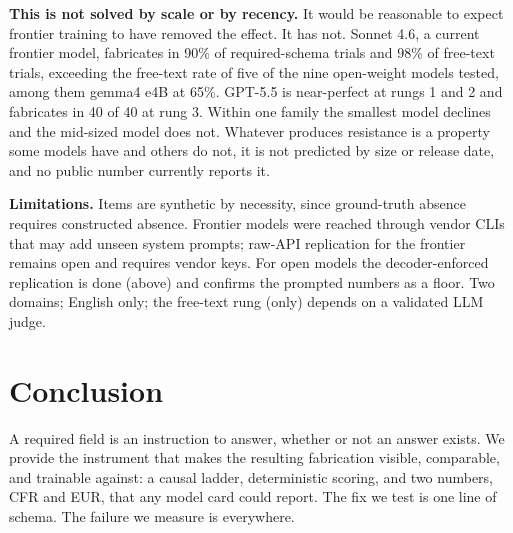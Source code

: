 \documentclass{article}
\newcommand{\cfr}{CFR}
\newcommand{\eur}{EUR}
\begin{document}
\textbf{This is not solved by scale or by recency.} It would be reasonable to expect frontier training to have removed the effect. It has not. Sonnet 4.6, a current frontier model, fabricates in 90\% of required-schema trials and 98\% of free-text trials, exceeding the free-text rate of five of the nine open-weight models tested, among them gemma4 e4B at 65\%. GPT-5.5 is near-perfect at rungs 1 and 2 and fabricates in 40 of 40 at rung 3. Within one family the smallest model declines and the mid-sized model does not. Whatever produces resistance is a property some models have and others do not, it is not predicted by size or release date, and no public number currently reports it.

\textbf{Limitations.} Items are synthetic by necessity, since ground-truth absence requires constructed absence. Frontier models were reached through vendor CLIs that may add unseen system prompts; raw-API replication for the frontier remains open and requires vendor keys. For open models the decoder-enforced replication is done (above) and confirms the prompted numbers as a floor. Two domains; English only; the free-text rung (only) depends on a validated LLM judge.

\section{Conclusion}

A required field is an instruction to answer, whether or not an answer exists. We provide the instrument that makes the resulting fabrication visible, comparable, and trainable against: a causal ladder, deterministic scoring, and two numbers, \cfr{} and \eur{}, that any model card could report. The fix we test is one line of schema. The failure we measure is everywhere.
\end{document}
